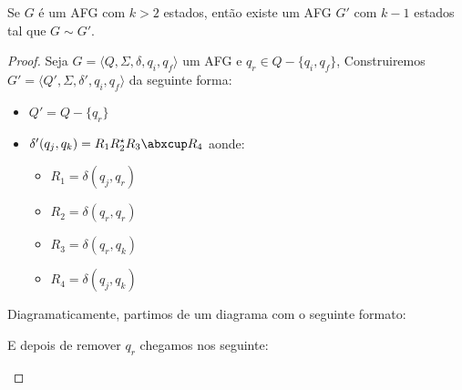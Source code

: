\begin{lemma}
\label{lemma:afg2}
Se $G$ é um AFG com $k > 2$ estados, então existe um AFG $G'$ com $k-1$ estados tal que $G \sim G'$.
\end{lemma}
\begin{proof}
  Seja $G = \langle Q, \Sigma, \delta, q_i, q_f \rangle$ um AFG e $q_r \in Q - \{q_i, q_f\}$,
Construiremos $G' = \langle Q', \Sigma, \delta', q_i, q_f \rangle$ da seguinte forma:

\begin{itemize}
\item[] $Q' = Q - \{q_r\}$
\item[] $\delta'(q_j, q_k) = R_1 R_2^\star R_3 \abxcup R_4$ aonde:
\begin{itemize}
\item[] $R_1 = \delta(q_j, q_r)$
\item[] $R_2 = \delta(q_r, q_r)$
\item[] $R_3 = \delta(q_r, q_k)$
\item[] $R_4 = \delta(q_j, q_k)$
\end{itemize}
\end{itemize}

Diagramaticamente, partimos de um diagrama com o seguinte formato:

\begin{center}
\end{center}

E depois de remover $q_r$ chegamos nos seguinte:

\begin{center}
\end{center}
\end{proof}


